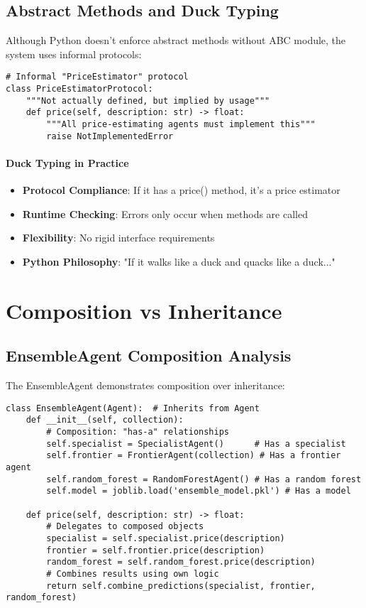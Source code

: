 \subsection{Abstract Methods and Duck Typing}

Although Python doesn't enforce abstract methods without ABC module, the system uses informal protocols:

\begin{lstlisting}[caption=Informal Protocol Definition]
# Informal "PriceEstimator" protocol
class PriceEstimatorProtocol:
    """Not actually defined, but implied by usage"""
    def price(self, description: str) -> float:
        """All price-estimating agents must implement this"""
        raise NotImplementedError
\end{lstlisting}

\paragraph{Duck Typing in Practice}
\begin{itemize}
\item \textbf{Protocol Compliance}: If it has a price() method, it's a price estimator
\item \textbf{Runtime Checking}: Errors only occur when methods are called
\item \textbf{Flexibility}: No rigid interface requirements
\item \textbf{Python Philosophy}: "If it walks like a duck and quacks like a duck..."
\end{itemize}

\section{Composition vs Inheritance}

\subsection{EnsembleAgent Composition Analysis}

The EnsembleAgent demonstrates composition over inheritance:

\begin{lstlisting}[caption=Composition Pattern Analysis]
class EnsembleAgent(Agent):  # Inherits from Agent
    def __init__(self, collection):
        # Composition: "has-a" relationships
        self.specialist = SpecialistAgent()      # Has a specialist
        self.frontier = FrontierAgent(collection) # Has a frontier agent  
        self.random_forest = RandomForestAgent() # Has a random forest
        self.model = joblib.load('ensemble_model.pkl') # Has a model
        
    def price(self, description: str) -> float:
        # Delegates to composed objects
        specialist = self.specialist.price(description)
        frontier = self.frontier.price(description)
        random_forest = self.random_forest.price(description)
        # Combines results using own logic
        return self.combine_predictions(specialist, frontier, random_forest)
\end{lstlisting}

